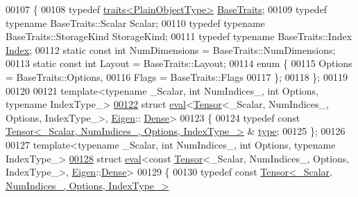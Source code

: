 \begin{DoxyCode}
00107 \{
00108   \textcolor{keyword}{typedef} \hyperlink{struct_eigen_1_1internal_1_1traits}{traits<PlainObjectType>} \hyperlink{struct_eigen_1_1internal_1_1traits}{BaseTraits};
00109   \textcolor{keyword}{typedef} \textcolor{keyword}{typename} BaseTraits::Scalar Scalar;
00110   \textcolor{keyword}{typedef} \textcolor{keyword}{typename} BaseTraits::StorageKind StorageKind;
00111   \textcolor{keyword}{typedef} \textcolor{keyword}{typename} BaseTraits::Index \hyperlink{namespace_eigen_a62e77e0933482dafde8fe197d9a2cfde}{Index};
00112   \textcolor{keyword}{static} \textcolor{keyword}{const} \textcolor{keywordtype}{int} NumDimensions = BaseTraits::NumDimensions;
00113   \textcolor{keyword}{static} \textcolor{keyword}{const} \textcolor{keywordtype}{int} Layout = BaseTraits::Layout;
00114   \textcolor{keyword}{enum} \{
00115     Options = BaseTraits::Options,
00116     Flags = BaseTraits::Flags
00117   \};
00118 \};
00119 
00120 
00121 \textcolor{keyword}{template}<\textcolor{keyword}{typename} \_Scalar, \textcolor{keywordtype}{int} NumIndices\_, \textcolor{keywordtype}{int} Options, \textcolor{keyword}{typename} IndexType\_>
\hyperlink{struct_eigen_1_1internal_1_1eval_3_01_tensor_3_01___scalar_00_01_num_indices___00_01_options_00_e6e8e1d1010612a3ca2530d1fede28ca}{00122} \textcolor{keyword}{struct }\hyperlink{struct_eigen_1_1internal_1_1eval}{eval}<\hyperlink{class_eigen_1_1_tensor}{Tensor}<\_Scalar, NumIndices\_, Options, IndexType\_>, \hyperlink{namespace_eigen}{Eigen}::
      \hyperlink{struct_eigen_1_1_dense}{Dense}>
00123 \{
00124   \textcolor{keyword}{typedef} \textcolor{keyword}{const} \hyperlink{class_eigen_1_1_tensor}{Tensor<\_Scalar, NumIndices\_, Options, IndexType\_>}
      & \hyperlink{class_eigen_1_1_tensor}{type};
00125 \};
00126 
00127 \textcolor{keyword}{template}<\textcolor{keyword}{typename} \_Scalar, \textcolor{keywordtype}{int} NumIndices\_, \textcolor{keywordtype}{int} Options, \textcolor{keyword}{typename} IndexType\_>
\hyperlink{struct_eigen_1_1internal_1_1eval_3_01const_01_tensor_3_01___scalar_00_01_num_indices___00_01_optc9dc50531ff0dd75e0889d13c2eb933e}{00128} \textcolor{keyword}{struct }\hyperlink{struct_eigen_1_1internal_1_1eval}{eval}<const \hyperlink{class_eigen_1_1_tensor}{Tensor}<\_Scalar, NumIndices\_, Options, IndexType\_>, 
      \hyperlink{namespace_eigen}{Eigen}::\hyperlink{struct_eigen_1_1_dense}{Dense}>
00129 \{
00130   \textcolor{keyword}{typedef} \textcolor{keyword}{const} \hyperlink{class_eigen_1_1_tensor}{Tensor<\_Scalar, NumIndices\_, Options, IndexType\_>}

\end{DoxyCode}
